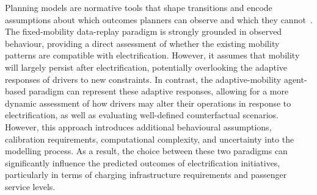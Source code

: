 \documentclass{elsarticle}
\begin{document}
Planning models are normative tools that shape transitions and encode assumptions about which outcomes planners can observe and which they cannot~\cite{sello2026_planning_paradigms, saltelli2020_models_serve_society}. The fixed-mobility data-replay paradigm is strongly grounded in observed behaviour, providing a direct assessment of whether the existing mobility patterns are compatible with electrification. However, it assumes that mobility will largely persist after electrification, potentially overlooking the adaptive responses of drivers to new constraints. In contrast, the adaptive-mobility agent-based paradigm can represent these adaptive responses, allowing for a more dynamic assessment of how drivers may alter their operations in response to electrification, as well as evaluating well-defined counterfactual scenarios. However, this approach introduces additional behavioural assumptions, calibration requirements, computational complexity, and uncertainty into the modelling process. As a result, the choice between these two paradigms can significantly influence the predicted outcomes of electrification initiatives, particularly in terms of charging infrastructure requirements and passenger service levels. 
\end{document}
